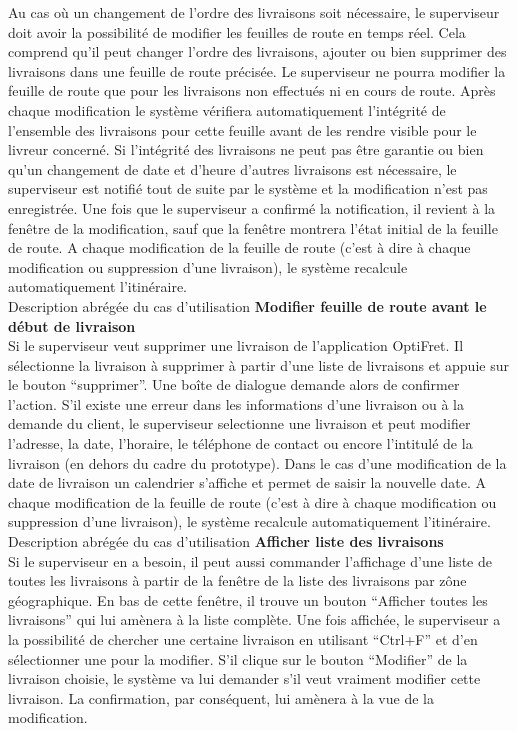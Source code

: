 \documentclass[a4paper]{report}
\begin{document}
Au cas où un changement de l’ordre des livraisons soit nécessaire, le
superviseur doit avoir la possibilité de modifier les feuilles de route en
temps réel. Cela comprend qu’il peut changer l’ordre des livraisons, ajouter
ou bien supprimer des livraisons dans une feuille de route précisée. Le
superviseur ne pourra modifier la feuille de route que pour les livraisons non
effectués ni en cours de route. Après chaque modification le système vérifiera
automatiquement l’intégrité de l’ensemble des livraisons pour cette feuille
avant de les rendre visible pour le livreur concerné.  Si l’intégrité des
livraisons ne peut pas être garantie ou bien qu’un changement de date et
d’heure d’autres livraisons est nécessaire, le superviseur est notifié tout de
suite par le système et la modification n’est pas enregistrée. Une fois que le
superviseur a confirmé la notification, il revient à la fenêtre de la
modification, sauf que la fenêtre montrera l’état initial de la feuille de
route. A chaque modification de la feuille de route (c’est à dire à chaque
modification ou suppression d’une livraison), le système recalcule
automatiquement l’itinéraire.\\


Description abrégée du cas d’utilisation \textbf{Modifier feuille de route
avant le début de livraison}\\

Si le superviseur veut supprimer une livraison de l’application OptiFret. Il
sélectionne la livraison à supprimer à partir d’une liste de livraisons et
appuie sur le bouton “supprimer”. Une boîte de dialogue demande alors de
confirmer l’action.  S’il existe une erreur dans les informations d’une
livraison ou à la demande du client, le superviseur selectionne une livraison
et peut modifier l’adresse, la date, l’horaire, le téléphone de contact ou
encore l’intitulé de la livraison (en dehors du cadre du prototype). Dans le
cas d’une modification de la date de livraison un calendrier s’affiche et
permet de saisir la nouvelle date. A chaque modification de la feuille de
route (c’est à dire à chaque modification ou suppression d’une livraison), le
système recalcule automatiquement l’itinéraire.\\


Description abrégée du cas d’utilisation \textbf{Afficher liste des livraisons}\\

Si le superviseur en a besoin, il peut aussi commander l’affichage d’une liste
de toutes les livraisons à partir de la fenêtre de la liste des livraisons par
zône géographique. En bas de cette fenêtre, il trouve un bouton “Afficher
toutes les livraisons” qui lui amènera à la liste complète. Une fois affichée,
le superviseur a la possibilité de chercher une certaine livraison en
utilisant “Ctrl+F” et d’en sélectionner une pour la modifier. S’il clique sur
le bouton “Modifier” de la livraison choisie, le système va lui demander s’il
veut vraiment modifier cette livraison. La confirmation, par conséquent, lui
amènera à la vue de la modification.\\
\end{document}
